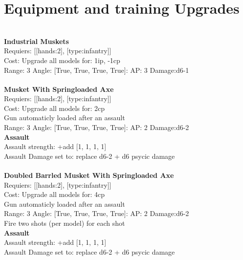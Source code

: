 \section{Equipment and training Upgrades}\ \\
{\bf Industrial Muskets } \\

Requiers: [[hands:2], [type:infantry]] \\
Cost: Upgrade all models for: 1ip, -1cp \\


Range: 3  Angle: [True, True, True, True]: AP: 3 Damage:d6-1 \\








\ \\
{\bf Musket With Springloaded Axe } \\

Requiers: [[hands:2], [type:infantry]] \\
Cost: Upgrade all models for: 2cp \\
Gun automaticly loaded after an assault\\ 


Range: 3  Angle: [True, True, True, True]: AP: 2 Damage:d6-2 \\



{\bf Assault} \ \\
Assault strength: +add [1, 1, 1, 1] 
\\ 
Assault Damage set to: replace d6-2 + d6 psycic damage
\\ 




\ \\
{\bf Doubled Barrled Musket With Springloaded Axe } \\

Requiers: [[hands:2], [type:infantry]] \\
Cost: Upgrade all models for: 4cp \\
Gun automaticly loaded after an assault\\ 


Range: 3  Angle: [True, True, True, True]: AP: 2 Damage:d6-2 \\
Fire two shots (per model) for each shot\\ 



{\bf Assault} \ \\
Assault strength: +add [1, 1, 1, 1] 
\\ 
Assault Damage set to: replace d6-2 + d6 psycic damage
\\ 




